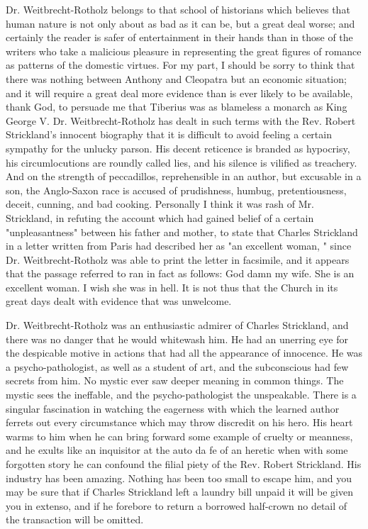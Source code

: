 \documentclass{article}
\begin{document}
  Dr. Weitbrecht-Rotholz belongs to that school of historians which believes that human nature is not only about as bad as it can be, but a great deal worse; and certainly the reader is safer of entertainment in their hands than in those of the writers who take a malicious pleasure in representing the great figures of romance as patterns of the domestic virtues. For my part, I should be sorry to think that there was nothing between Anthony and Cleopatra but an economic situation; and it will require a great deal more evidence than is ever likely to be available, thank God, to persuade me that Tiberius was as blameless a monarch as King George V. Dr. Weitbrecht-Rotholz has dealt in such terms with the Rev. Robert Strickland's innocent biography that it is difficult to avoid feeling a certain sympathy for the unlucky parson. His decent reticence is branded as hypocrisy, his circumlocutions are roundly called lies, and his silence is vilified as treachery. And on the strength of peccadillos, reprehensible in an author, but excusable in a son, the Anglo-Saxon race is accused of prudishness, humbug, pretentiousness, deceit, cunning, and bad cooking. Personally I think it was rash of Mr. Strickland, in refuting the account which had gained belief of a certain "unpleasantness" between his father and mother, to state that Charles Strickland in a letter written from Paris had described her as "an excellent woman, " since Dr. Weitbrecht-Rotholz was able to print the letter in facsimile, and it appears that the passage referred to ran in fact as follows: God damn my wife. She is an excellent woman. I wish she was in hell. It is not thus that the Church in its great days dealt with evidence that was unwelcome.\par
  Dr. Weitbrecht-Rotholz was an enthusiastic admirer of Charles Strickland, and there was no danger that he would whitewash him. He had an unerring eye for the despicable motive in actions that had all the appearance of innocence. He was a psycho-pathologist, as well as a student of art, and the subconscious had few secrets from him. No mystic ever saw deeper meaning in common things. The mystic sees the ineffable, and the psycho-pathologist the unspeakable. There is a singular fascination in watching the eagerness with which the learned author ferrets out every circumstance which may throw discredit on his hero. His heart warms to him when he can bring forward some example of cruelty or meanness, and he exults like an inquisitor at the auto da fe of an heretic when with some forgotten story he can confound the filial piety of the Rev. Robert Strickland. His industry has been amazing. Nothing has been too small to escape him, and you may be sure that if Charles Strickland left a laundry bill unpaid it will be given you in extenso, and if he forebore to return a borrowed half-crown no detail of the transaction will be omitted.\par
\end{document}
